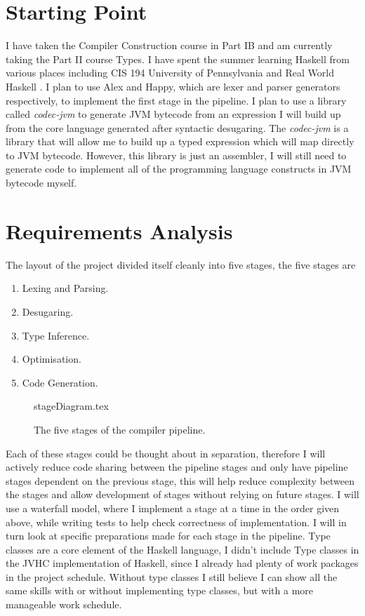 \documentclass[float=false, crop=false]{standalone}
\begin{document}
\section{Starting Point}


  I have taken the Compiler Construction course in Part IB and am currently taking the Part II course Types. I have spent the summer
  learning Haskell from various places including CIS 194 University of Pennsylvania \cite{cis194} and Real World Haskell \cite{realworldhaskell}.
  I plan to use Alex and Happy, which are lexer and parser generators
  respectively, to implement the first stage in the pipeline.
  I plan to use a library called \textit{codec-jvm} to generate JVM bytecode from an expression I will build up from the core language generated after
  syntactic desugaring. The \textit{codec-jvm} is a library that will allow me to build up a typed expression which will map directly
  to JVM bytecode. However, this library is just an assembler, I will still need to generate code to implement all of the
  programming language constructs in JVM bytecode myself.

\section{Requirements Analysis}

The layout of the project divided itself cleanly into five stages, the five stages are
\begin{enumerate}
  \item Lexing and Parsing.
  \item Desugaring.
  \item Type Inference.
  \item Optimisation.
  \item Code Generation.
\end{enumerate}

\begin{figure}
  \centering
  {stageDiagram.tex}
  \caption{The five stages of the compiler pipeline.}
\end{figure}
Each of these stages could be thought about in separation, therefore I will actively 
reduce code sharing between the pipeline stages and only have pipeline stages dependent 
on the previous stage, this will help reduce complexity between the stages and 
allow development of stages without relying on future 
stages. I will use a waterfall model, where I implement a stage
at a time in the order given above, while writing tests to help check
correctness of implementation.
I will in turn look at specific preparations made for each stage in the pipeline.
Type classes are a core element of the Haskell language, I didn't include Type classes
in the JVHC implementation of Haskell, since I already had plenty of work packages in
the project schedule. Without type classes I still believe I can show all
the same skills with or without implementing type classes, but with a more manageable work schedule.
\end{document}
